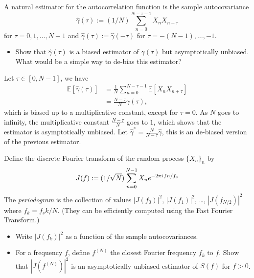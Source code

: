 \documentclass[11pt]{article}
\begin{document}
\begin{exercise}
A natural estimator for the autocorrelation function is the sample autocovariance
\begin{equation}
    \hat{\gamma}(\tau) := (1/N) \sum_{n=0}^{N-\tau-1} X_n X_{n+\tau}
\end{equation}
for $\tau=0,1,\dots,N-1$ and $\hat{\gamma}(\tau):=\hat{\gamma}(-\tau)$ for $\tau=-(N-1),\dots,-1$.
\begin{itemize}
    \item Show that $\hat{\gamma}(\tau)$ is a biased estimator of $\gamma(\tau)$ but asymptotically unbiased.
    What would be a simple way to de-bias this estimator?
\end{itemize}

\end{exercise}

\begin{solution}
Let $\tau \in [0, N-1]$, we have
\begin{equation}
    \begin{split}
        \mathbb{E}[\hat{\gamma}(\tau)] &= \frac{1}{N}\sum_{n=0}^{N-\tau-1}\mathbb{E}[X_n X_{n+\tau}]\\
                                    &= \frac{N-\tau}{N}\gamma(\tau),
    \end{split}
\end{equation}
which is biased up to a multiplicative constant, except for $\tau = 0$. As $N$ goes to infinity, the multiplicative constant $\frac{N-\tau}{N}$ goes to $1$, which shows that the estimator is asymptotically unbiased. Let $\hat{\gamma}^* = \frac{N}{N-\tau}\hat{\gamma}$, this is an de-biased version of the previous estimator.
\end{solution}

\begin{exercise}
Define the discrete Fourier transform of the random process $\{X_n\}_n$ by
\begin{equation}
    J(f) := (1/\sqrt{N})\sum_{n=0}^{N-1} X_n e^{-2\pi{i\mkern1mu} f n/f_s}
\end{equation}
The \textit{periodogram} is the collection of values $|J(f_0)|^2$, $|J(f_1)|^2$, \dots, $|J(f_{N/2})|^2$ where $f_k = f_s k/N$.
(They can be efficiently computed using the Fast Fourier Transform.)
\begin{itemize}
    \item Write $|J(f_k)|^2$ as a function of the sample autocovariances.
    \item For a frequency $f$, define $f^{(N)}$ the closest Fourier frequency $f_k$ to $f$.
    Show that $|J(f^{(N)})|^2$ is an asymptotically unbiased estimator of $S(f)$ for $f>0$.
\end{itemize}
\end{exercise}
\end{document}
